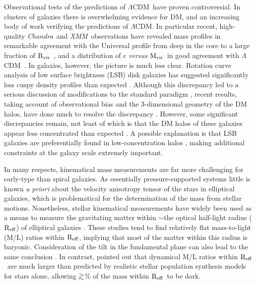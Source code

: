 \documentclass{emulateapj}
\def\spose#1{\hbox to 0pt{#1\hss}}
\def\gtsim{$\mathrel{\spose{\lower 3pt\hbox{$\sim$}} 
        \raise 2.0pt\hbox{$>$}}$\thinspace}
\def \eg {e.g.}
\newcommand{\mvir}{${\rm M_{vir}}$}
\newcommand{\reff}{${\rm R_{eff}}$}
\newcommand{\chandra }{{\em Chandra}}
\newcommand{\lcdm}{$\Lambda$CDM}
\newcommand{\xmm }{{\em XMM}}
\newcommand{\rvir }{${\rm R_{vir}}$}
\begin{document}
Observational tests of the predictions of \lcdm\ have proven
controversial. In clusters of galaxies there is overwhelming evidence
for DM, and an increasing body of work verifying the 
predictions of \lcdm. In particular recent, high-quality 
\chandra\ and \xmm\ observations have revealed mass profiles
in remarkable agreement with the Universal profile from
deep in the core to a large fraction of 
\rvir\ \citep[\eg][]{lewis03a,zappacosta06a,vikhlinin05b},
and a distribution of c {\em versus} \mvir\ in good agreement with
\lcdm\ \citep{pointecouteau05a}.
In galaxies, however, the picture is much less clear. Rotation curve
analysis of low surface brightness (LSB) disk galaxies has suggested
significantly less cuspy density profiles than expected 
\citep[\eg][]{swaters00a}. 
Although this discrepancy led to a serious discussion of 
modifications to the standard paradigm 
\citep[\eg][]{hogan00a,spergel00a,zentner02a,kaplinghat05a,cembranos05a}, 
recent  results, taking account of observational bias and the 3-dimensional
geometry of the DM halos, have done much to resolve the discrepancy
\citep[\eg][]{swaters03a,simon05a}. However, some 
significant discrepancies remain, not least of which 
is that the DM halos of these galaxies appear less concentrated
than expected \citep[\eg][]{gonzalez00a,kassin06a}.
A possible explanation is that LSB galaxies are preferentially 
found in low-concentration halos \citep{bullock01a,bailin05a,wechsler05a}, making
additional constraints at the galaxy scale extremely important. %

In many respects, kinematical mass measurements 
are far more challenging for early-type than spiral galaxies.
As essentially pressure-supported systems little is known
{\em a priori} about the velocity anisotropy tensor of
the stars in elliptical galaxies, which is problematical for
the determination of the mass from stellar motions.
Nonetheless, stellar kinematical measurements
have widely been used as a means to measure the gravitating matter
within $\sim$the optical half-light radius (\reff) of 
elliptical galaxies \citep[\eg][]{binney90a,vandermarel91a,gerhard01a}.
These studies tend to find
relatively flat mass-to-light (M/L) ratios within \reff, 
implying that most of the matter within this radius is baryonic.
Consideration of the tilt in the fundamental plane can also
lead to the same conclusion \citep{borriello03a}.
In contrast, \citet{padmanabhan04a} pointed out that 
dynamical M/L ratios within \reff\ are much larger than 
predicted by realistic stellar population synthesis models for 
stars alone, allowing 
\gtsim 50\% of the mass within \reff\ to be dark. %
\end{document}

